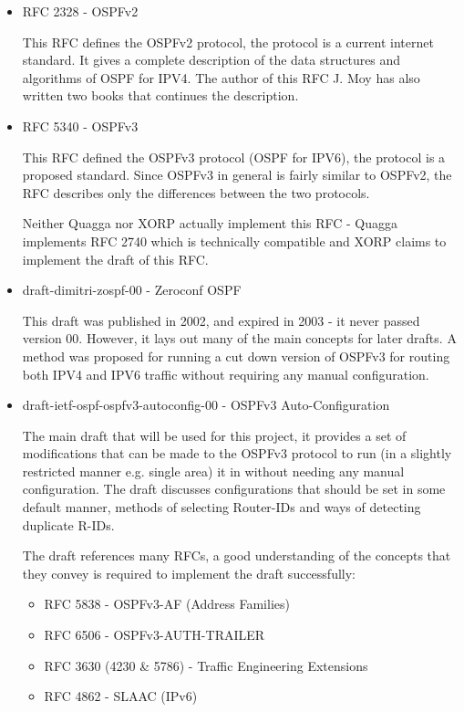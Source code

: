 \documentclass[12pt]{report}
\begin{document}
\begin{itemize}

	\item RFC 2328 - OSPFv2 

	This RFC defines the OSPFv2 protocol, the protocol is a current 
	internet standard. 
	It gives a complete description of the data structures and algorithms
	of OSPF for IPV4. 
	The author of this RFC J. Moy has also written two books that 
	continues the description. 

	\item RFC 5340 - OSPFv3
	
	This RFC defined the OSPFv3 protocol (OSPF for IPV6), the protocol is a
	proposed standard.  Since OSPFv3 in general is fairly similar to OSPFv2,
	the RFC describes only the differences between the two protocols. 

	Neither Quagga nor XORP actually implement this RFC - Quagga implements
	RFC 2740 which is technically compatible and XORP claims to implement
	the draft of this RFC. 

	\item draft-dimitri-zospf-00 - Zeroconf OSPF

	This draft was published in 2002, and expired in 2003 - it never passed
	version 00.  However, it lays out many of the main concepts for later
	drafts.  A method was proposed for running a cut down version of OSPFv3
	for routing both IPV4 and IPV6 traffic without requiring any manual
		configuration. 

	\item draft-ietf-ospf-ospfv3-autoconfig-00 - OSPFv3 Auto-Configuration 
	
	The main draft that will be used for this project, it provides a set of
	modifications that can be made to the OSPFv3 protocol to run (in a
	slightly restricted manner e.g.  single area) it in without needing any
	manual configuration.  The draft discusses configurations that should be
	set in some default manner, methods of selecting Router-IDs and ways of
	detecting duplicate R-IDs. 

	The draft references many RFCs, a good understanding of the concepts 
	that they convey is required to implement the draft successfully:

	\begin{itemize}
			\item RFC 5838 - OSPFv3-AF (Address Families)
			\item RFC 6506 - OSPFv3-AUTH-TRAILER
			\item RFC 3630 (4230 \& 5786) - 
			Traffic Engineering Extensions 
			\item RFC 4862 - SLAAC (IPv6) 
			\end{itemize}
	


\end{itemize}
\end{document}
